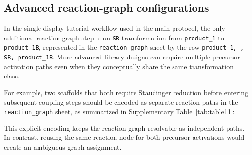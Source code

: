 \subsection{Advanced reaction-graph configurations}
\label{supp:reaction-graph-advanced}

In the single-display tutorial workflow used in the main protocol, the only additional reaction-graph step is an \texttt{SR} transformation from \texttt{product\_1} to \texttt{product\_1B}, represented in the \texttt{reaction\_graph} sheet by the row \texttt{product\_1, , SR, product\_1B}. More advanced library designs can require multiple precursor-activation paths even when they conceptually share the same transformation class.

For example, two scaffolds that both require Staudinger reduction before entering subsequent coupling steps should be encoded as separate reaction paths in the \texttt{reaction\_graph} sheet, as summarized in Supplementary Table~\ref{tab:table11}:



This explicit encoding keeps the reaction graph resolvable as independent paths. In contrast, reusing the same reaction node for both precursor activations would create an ambiguous graph assignment.
